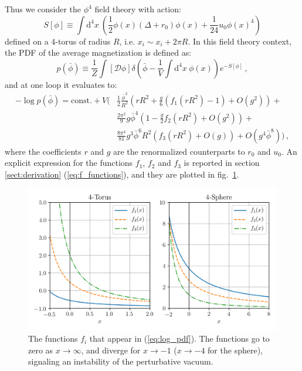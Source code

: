 \documentclass[11pt,a4paper]{article}
\newcommand{\dd}{\mathrm{d}}
\begin{document}
Thus we consider the $\phi^4$ field theory with action:
\begin{equation}
  S[\phi] \equiv \int \dd^4 x\ \left(
    \frac{1}{2} \phi(x)\left(\Delta + r_0\right)\phi(x) +
    \frac{1}{24} u_0 \phi(x)^4\right)
\end{equation}
defined on a 4-torus of radius $R$, i.e. $x_i\sim x_i + 2\pi R$. In this field
theory context, the PDF of the average magnetization is defined as:
\begin{equation}
    \label{eq:pdf_definition}
    p(\bar\phi) \equiv \frac{1}{Z} \int \left[\mathcal{D}\phi\right]
    \delta\left(\bar{\phi} - \frac{1}{V}\int\dd^4 x\ \phi(x)\right)
    e^{-S[\phi]}\,,
\end{equation}
and at one loop it evaluates to:
\begin{equation}
\label{eq:log_pdf}
\begin{split}
    -\log p(\bar{\phi}) = \mathrm{const.} +  V\Bigg(
  &\frac{1}{2} \frac{\bar{\phi}^2}{R^2} \left(
    r R^2 + \frac{g}{6} \left(f_1\left(r R^2\right) - 1\right)
    + O\left(g^2\right)\right) + \\
  & \frac{2\pi^2}{9}g\bar{\phi}^4\left(
    1 - \frac{g}{2}f_2\left(r R^2\right)
    + O\left(g^2\right)\right) + \\
  & \frac{8\pi^4}{81} g^3 \bar{\phi}^6 R^2\left(
    f_3\left(r R^2\right)
    + O\left(g\right)\right) + O\left(g^4\bar{\phi}^8\right) \Bigg)\,,
\end{split}
\end{equation}
where the coefficients $r$ and $g$ are the renormalized counterparts to $r_0$
and $u_0$. An explicit expression for the functions $f_1$, $f_2$ and $f_3$ is
reported in section \ref{sect:derivation} (\ref{eq:f_functions}), and they are
plotted in
fig.~\ref{fig:f_functions}.

\begin{figure}
\begin{center}
\includegraphics[scale=0.75]{f_functions.png}
\end{center}
\caption{\label{fig:f_functions} The functions $f_i$ that appear in
    (\ref{eq:log_pdf}). The functions go to zero as $x\to\infty$, and diverge
    for $x\to-1$ ($x\to-4$ for the sphere), signaling an instability of the
    perturbative vacuum.}
\end{figure}
\end{document}
